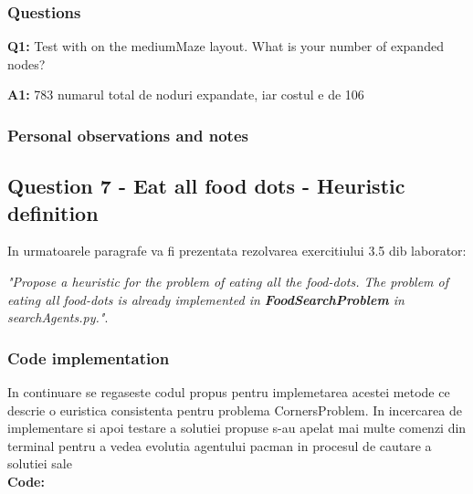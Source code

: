 \subsubsection{Questions}

\textbf{Q1:} Test  with  on the mediumMaze layout. What is your number of expanded nodes?

\textbf{A1:} 783 numarul total de noduri expandate, iar costul e de 106


\subsubsection{Personal observations and notes}

\subsection{Question 7 - Eat all food dots - Heuristic definition}
In urmatoarele paragrafe va fi prezentata rezolvarea exercitiului 3.5 dib laborator: \newline


\textit{"Propose a heuristic for the problem of eating all the food-dots. The problem of eating all food-dots is already implemented in \textbf{FoodSearchProblem} in searchAgents.py."}.


\subsubsection{Code implementation}
 In continuare se regaseste codul propus pentru implemetarea acestei metode ce descrie o euristica consistenta pentru problema CornersProblem. In incercarea de implementare si apoi testare a solutiei propuse s-au apelat mai multe comenzi din terminal pentru a vedea evolutia agentului pacman in procesul de cautare a solutiei sale \newline \\

\textbf{Code:}

\inputminted[linenos]{python}{code/07_find_food.py}


